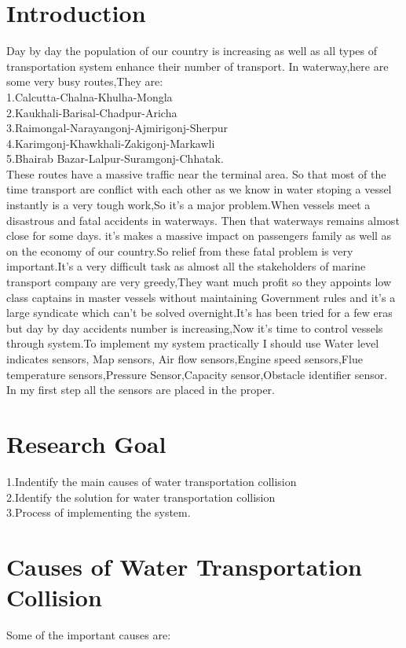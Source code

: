 \documentclass{article}
\begin{document}
\section{Introduction}
Day by day the population of our country is increasing as well as all types of transportation system enhance their number of transport. In waterway,here are some very busy routes,They are:\\
1.Calcutta-Chalna-Khulha-Mongla\\
2.Kaukhali-Barisal-Chadpur-Aricha\\
3.Raimongal-Narayangonj-Ajmirigonj-Sherpur\\
4.Karimgonj-Khawkhali-Zakigonj-Markawli\\
5.Bhairab Bazar-Lalpur-Suramgonj-Chhatak\cite{azad2009riverine}.\\
These routes have a massive traffic near the terminal area. So that most of the time transport are conflict with each other as we know in water stoping a vessel instantly is a very tough work,So it's a major problem\cite{awal2006study}.When vessels meet a disastrous and fatal accidents in waterways. Then that waterways remains almost close for some days. it's makes a massive impact on passengers family as well as on the economy of our country\cite{islam2015investigation}.So relief from these fatal problem is very important.It's a very difficult task as almost all the stakeholders of marine transport company are very greedy,They want much profit so they appoints low class captains in master vessels without maintaining Government rules and it's a large syndicate which can't be solved overnight.It's has been tried for a few eras but day by day accidents number is increasing,Now it's time to control vessels through system.To implement my system practically I should use Water level indicates sensors, Map sensors, Air flow sensors,Engine speed sensors,Flue temperature sensors,Pressure Sensor,Capacity sensor,Obstacle identifier sensor.\cite{awal2014study}\\
In my first step all the sensors are placed in the proper.

\section{Research Goal}
1.Indentify the main causes of water transportation collision\\
2.Identify the solution for water transportation collision\\
3.Process of implementing the system.
\section{Causes of Water Transportation Collision}
Some of the important causes are\cite{awal2007marine}:
\end{document}
